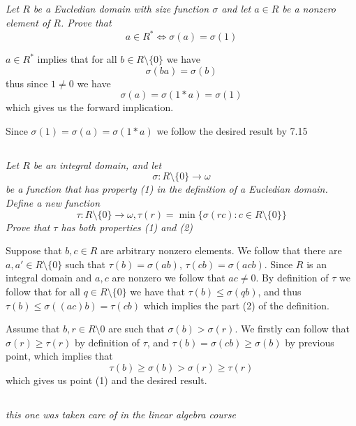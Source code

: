 \documentclass[11pt,oneside,titlepage]{book}
\newcommand{\set}[1]{\{ #1 \}}
\begin{document}
\subsection{}

\textit{Let $R$ be a Eucledian domain with size function $\sigma$ and
  let $a \in R$ be a nonzero element of $R$. Prove that
  $$a \in R^* \iff \sigma(a) = \sigma(1)$$
}

$a \in R^*$ implies that for all $b \in R \setminus \set{0}$ we have
$$\sigma(ba) = \sigma(b)$$
thus since $1 \neq 0$ we have
$$\sigma(a) = \sigma(1 * a) = \sigma(1)$$
which gives us the forward implication.

Since $\sigma(1) = \sigma(a)  = \sigma(1 * a)$
we follow the desired result by 7.15

\subsection{}

\textit{Let $R$ be an integral domain, and let
  $$\sigma: R \setminus \set{0} \to \omega$$
  be a function that has property (1) in the definition of a Eucledian
  domain. Define a new function
  $$\tau: R \setminus \set{0} \to \omega,
  \tau(r) = \min \set{\sigma(rc): c \in R \setminus \set{0}}$$
  Prove that $\tau$ has both properties (1) and (2)
}

Suppose that $b, c \in R$ are arbitrary nonzero elements.  We follow
that there are $a, a' \in R \setminus \set{0}$ such that $\tau(b) =
\sigma(ab)$, $\tau(cb) = \sigma(acb)$. Since $R$ is an integral domain
and $a, c$ are nonzero we follow that $ac \neq 0$. By definition of
$\tau$ we follow that for all $q \in R \setminus \set{0}$ we have that
$\tau(b) \leq \sigma(qb)$, and thus $\tau(b) \leq \sigma((ac)b) =
\tau(cb)$ which implies the part (2) of the definition.


Assume that $b, r \in R \setminus 0$ are such that $\sigma(b) >
\sigma(r)$. We firstly can follow that $\sigma(r) \geq \tau(r)$
by definition of $\tau$, and $\tau(b) = \sigma(cb) \geq \sigma(b)$ by
previous point, which implies that
$$\tau(b) \geq \sigma(b) > \sigma(r) \geq \tau(r)$$
which gives us point (1) and the desired result.

\subsection{}

\textit{this one was taken care of in the linear algebra course}
\end{document}
